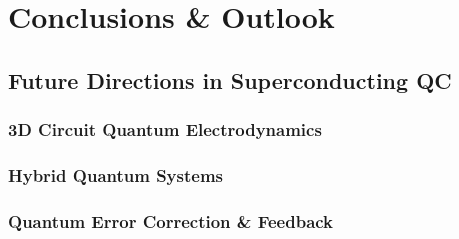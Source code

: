 \chapter{Conclusions \& Outlook}


\section{Future Directions in Superconducting QC}


\subsection{3D Circuit Quantum Electrodynamics}


\subsection{Hybrid Quantum Systems}


\subsection{Quantum Error Correction \& Feedback}

